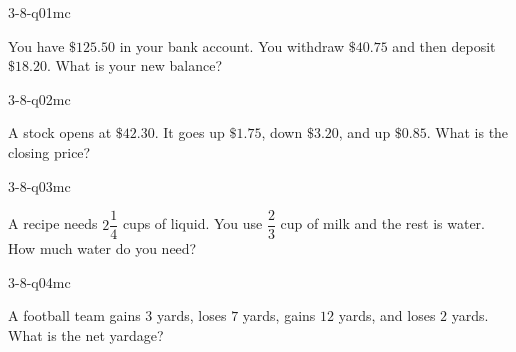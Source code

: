 

\begin{practiceQuestion}{3-8-q01}{mc}
\begin{questionText}
You have $\$125.50$ in your bank account. You withdraw $\$40.75$ and then deposit $\$18.20$. What is your new balance?
\end{questionText}
\end{practiceQuestion}

\begin{practiceQuestion}{3-8-q02}{mc}
\begin{questionText}
A stock opens at $\$42.30$. It goes up $\$1.75$, down $\$3.20$, and up $\$0.85$. What is the closing price?
\end{questionText}
\end{practiceQuestion}

\begin{practiceQuestion}{3-8-q03}{mc}
\begin{questionText}
A recipe needs $2\dfrac{1}{4}$ cups of liquid. You use $\dfrac{2}{3}$ cup of milk and the rest is water. How much water do you need?
\end{questionText}
\end{practiceQuestion}

\begin{practiceQuestion}{3-8-q04}{mc}
\begin{questionText}
A football team gains $3$ yards, loses $7$ yards, gains $12$ yards, and loses $2$ yards. What is the net yardage?
\end{questionText}
\end{practiceQuestion}

